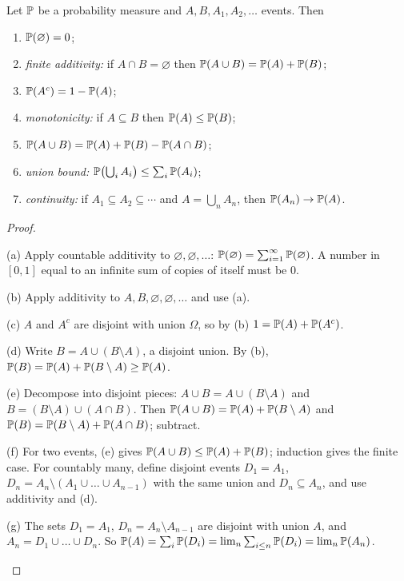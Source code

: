 \begin{proposition}\label{prop:probprops}
  Let $\mathbb{P}$ be a probability measure and $A,B,A_1,A_2,\dots$ events. Then
  \begin{enumerate}
    \item[(a)] $\mathbb{P}(\varnothing)=0$;
    \item[(b)] \emph{finite additivity:} if $A\cap B=\varnothing$ then $\mathbb{P}(A\cup B)=\mathbb{P}(A)+\mathbb{P}(B)$;
    \item[(c)] $\mathbb{P}(A^c)=1-\mathbb{P}(A)$;
    \item[(d)] \emph{monotonicity:} if $A\subseteq B$ then $\mathbb{P}(A)\le\mathbb{P}(B)$;
    \item[(e)] $\mathbb{P}(A\cup B)=\mathbb{P}(A)+\mathbb{P}(B)-\mathbb{P}(A\cap B)$;
    \item[(f)] \emph{union bound:} $\mathbb{P}\bigl(\bigcup_iA_i\bigr)\le\sum_i\mathbb{P}(A_i)$;
    \item[(g)] \emph{continuity:} if $A_1\subseteq A_2\subseteq\cdots$ and $A=\bigcup_nA_n$, then $\mathbb{P}(A_n)\to\mathbb{P}(A)$.
  \end{enumerate}
\end{proposition}
\begin{proof}
  \begin{steps}
    \item (a) Apply countable additivity to $\varnothing,\varnothing,\dots$: $\mathbb{P}(\varnothing)=\sum_{i=1}^\infty\mathbb{P}(\varnothing)$. A number in $[0,1]$ equal to an infinite sum of copies of itself must be $0$.
    \item (b) Apply additivity to $A,B,\varnothing,\varnothing,\dots$ and use (a).
    \item (c) $A$ and $A^c$ are disjoint with union $\Omega$, so by (b) $1=\mathbb{P}(A)+\mathbb{P}(A^c)$.
    \item (d) Write $B=A\cup(B\setminus A)$, a disjoint union. By (b), $\mathbb{P}(B)=\mathbb{P}(A)+\mathbb{P}(B\setminus A)\ge\mathbb{P}(A)$.
    \item (e) Decompose into disjoint pieces: $A\cup B=A\cup(B\setminus A)$ and $B=(B\setminus A)\cup(A\cap B)$. Then $\mathbb{P}(A\cup B)=\mathbb{P}(A)+\mathbb{P}(B\setminus A)$ and $\mathbb{P}(B)=\mathbb{P}(B\setminus A)+\mathbb{P}(A\cap B)$; subtract.
    \item (f) For two events, (e) gives $\mathbb{P}(A\cup B)\le\mathbb{P}(A)+\mathbb{P}(B)$; induction gives the finite case. For countably many, define disjoint events $D_1=A_1$, $D_n=A_n\setminus(A_1\cup\dots\cup A_{n-1})$ with the same union and $D_n\subseteq A_n$, and use additivity and (d).
    \item (g) The sets $D_1=A_1$, $D_n=A_n\setminus A_{n-1}$ are disjoint with union $A$, and $A_n=D_1\cup\dots\cup D_n$. So $\mathbb{P}(A)=\sum_{i}\mathbb{P}(D_i)=\lim_n\sum_{i\le n}\mathbb{P}(D_i)=\lim_n\mathbb{P}(A_n)$. \qedhere
  \end{steps}
\end{proof}

